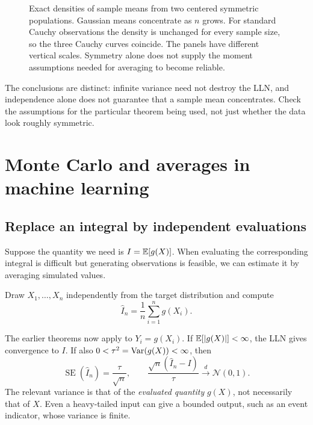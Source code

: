 \begin{figure}[H]
  \centering
  
  \caption{Exact densities of sample means from two centered symmetric
  populations. Gaussian means concentrate as \(n\) grows. For standard
  Cauchy observations the density is unchanged for every sample size,
  so the three Cauchy curves coincide. The panels have different
  vertical scales. Symmetry alone does not supply
  the moment assumptions needed for averaging to become reliable.}
  \label{fig:ch4-heavy-tails}
\end{figure}

The conclusions are distinct: infinite variance need not destroy the
LLN, and independence alone does not guarantee that a sample mean
concentrates. Check the assumptions for the particular theorem being
used, not just whether the data look roughly symmetric.

\section{Monte Carlo and averages in machine learning}
\label{sec:monte-carlo}

\subsection{Replace an integral by independent evaluations}

Suppose the quantity we need is \(I=\mathbb{E}[g(X)]\). When evaluating
the corresponding integral is difficult but generating observations
is feasible, we can estimate it by averaging simulated values.
\begin{definition}
Draw \(X_1,\ldots,X_n\) independently from the target
distribution and compute
\begin{equation}
  \widehat I_n=\frac1n\sum_{i=1}^n g(X_i).
  \label{eq:monte-carlo}
\end{equation}
\end{definition}
The earlier theorems now apply
to \(Y_i=g(X_i)\). If \(\mathbb{E}[|g(X)|]<\infty\), the LLN gives
convergence to \(I\). If also
\(0<\tau^2=\operatorname{Var}(g(X))<\infty\), then
\[
  \operatorname{SE}(\widehat I_n)=\frac{\tau}{\sqrt n},\qquad
  \frac{\sqrt n(\widehat I_n-I)}{\tau}
  \xrightarrow{d}\mathcal N(0,1).
\]
The relevant variance is that of the \emph{evaluated quantity}
\(g(X)\), not necessarily that of \(X\). Even a heavy-tailed input
can give a bounded output, such as an event indicator, whose variance
is finite.

